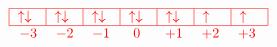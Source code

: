 \[
    \textcolor{red}{
        \begin{array}{c}
            \begin{tabular}{|m{0.5cm}|m{0.5cm}|m{0.5cm}|m{0.5cm}|m{0.5cm}|m{0.5cm}|m{0.5cm}|}
                \hline
                $\uparrow \downarrow$ & $\uparrow \downarrow$ & $\uparrow \downarrow$ & $\uparrow \downarrow$ & $\uparrow \downarrow$ & $\uparrow$ & $\uparrow$ \\
                \hline
            \end{tabular} \\ 
            \begin{tabular}{m{0.5cm} m{0.5cm} m{0.5cm} m{0.5cm} m{0.5cm} m{0.5cm} m{0.5cm}}
                $-3$ & $-2$ & $-1$ & \text{ 0 } & $+1$ & $+2$ & $+3$
            \end{tabular}
        \end{array}
    }
\]